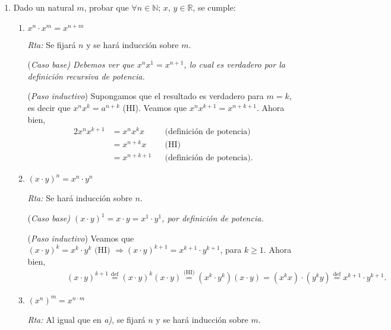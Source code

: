 \documentclass[a4paper,12pt,twoside,spanish,reqno]{amsbook}
\numberwithin{equation}{section}
\newcommand{\rta}{\noindent\textit{Rta: }}
\begin{document}
\begin{enumerate}
        
        \item Dado un natural $m$, probar que $\forall n \in {\mathbb N} $; $x$, $y \in {\mathbb R}$, se cumple:
            \begin{enumerate}
                \item $x^n \cdot x^m = x^{n+m}$
                
                \rta Se fijará $n$ y se hará inducción sobre $m$. 
                
                \noindent(\it Caso  base\rm) Debemos ver que $x^{n}x^1 = x^{n+1}$, lo cual es verdadero por la definición recursiva de potencia. 
                
                \noindent ({\it Paso  inductivo}) Supongamos que el resultado es verdadero para $m=k$, es decir que $x^{n}x^k = a^{n+k}$ (HI). Veamos que  $x^{n}x^{k+1} = x^{n+k+1}$. Ahora bien, 
                \begin{alignat*}2
                x^{n}x^{k+1} &= x^{n}x^{k}x&  & \text{(definición de potencia)} \\
                &= x^{n+k}x& & \text{(HI)} \\
                &= x^{n+k+1}&  & \text{(definición de potencia)}. 
                \end{alignat*}
                \item $(x\cdot y)^n=x^n\cdot y^n$
                
                \rta Se  hará inducción sobre $n$.
                
                \noindent(\it Caso  base\rm) $(x\cdot y)^1=x\cdot y = x^1\cdot y^1$, por definición de potencia. 
                
                \noindent ({\it Paso  inductivo}) Veamos que  $(x\cdot y)^k=x^k\cdot y^k \text{ (HI) } \Rightarrow (x\cdot y)^{k+1}=x^{k+1}\cdot y^{k+1}$, para $k \ge 1$. Ahora bien,
                \begin{multline*}
                \qquad\; \qquad (x\cdot y)^{k+1} \overset{\text{def}}{=} (x\cdot y)^{k} (x\cdot y) \overset{\text{(HI)}}{=} (x^{k}\cdot y^{k}) (x\cdot y) = (x^{k}x)\cdot (y^{k}y) \overset{\text{def}}{=}  x^{k+1}\cdot y^{k+1}.
                \end{multline*}
                
                \item $(x^n)^m = x^{n\cdot m}$
                
                \rta Al igual que en \textit{a)}, se fijará $n$ y se hará inducción sobre $m$.
                

\end{enumerate}
\end{enumerate}
\end{document}
